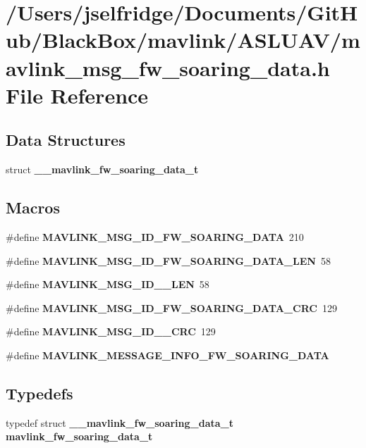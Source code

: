 \section{/\+Users/jselfridge/\+Documents/\+Git\+Hub/\+Black\+Box/mavlink/\+A\+S\+L\+U\+A\+V/mavlink\+\_\+msg\+\_\+fw\+\_\+soaring\+\_\+data.h File Reference}
\label{mavlink__msg__fw__soaring__data_8h}
\subsection*{Data Structures}
\begin{DoxyCompactItemize}
\item 
struct \textbf{ \+\_\+\+\_\+mavlink\+\_\+fw\+\_\+soaring\+\_\+data\+\_\+t}
\end{DoxyCompactItemize}
\subsection*{Macros}
\begin{DoxyCompactItemize}
\item 
\#define \textbf{ M\+A\+V\+L\+I\+N\+K\+\_\+\+M\+S\+G\+\_\+\+I\+D\+\_\+\+F\+W\+\_\+\+S\+O\+A\+R\+I\+N\+G\+\_\+\+D\+A\+TA}~210
\item 
\#define \textbf{ M\+A\+V\+L\+I\+N\+K\+\_\+\+M\+S\+G\+\_\+\+I\+D\+\_\+\+F\+W\+\_\+\+S\+O\+A\+R\+I\+N\+G\+\_\+\+D\+A\+T\+A\+\_\+\+L\+EN}~58
\item 
\#define \textbf{ M\+A\+V\+L\+I\+N\+K\+\_\+\+M\+S\+G\+\_\+\+I\+D\+\_\+\_\+\+L\+EN}~58
\item 
\#define \textbf{ M\+A\+V\+L\+I\+N\+K\+\_\+\+M\+S\+G\+\_\+\+I\+D\+\_\+\+F\+W\+\_\+\+S\+O\+A\+R\+I\+N\+G\+\_\+\+D\+A\+T\+A\+\_\+\+C\+RC}~129
\item 
\#define \textbf{ M\+A\+V\+L\+I\+N\+K\+\_\+\+M\+S\+G\+\_\+\+I\+D\+\_\+\_\+\+C\+RC}~129
\item 
\#define \textbf{ M\+A\+V\+L\+I\+N\+K\+\_\+\+M\+E\+S\+S\+A\+G\+E\+\_\+\+I\+N\+F\+O\+\_\+\+F\+W\+\_\+\+S\+O\+A\+R\+I\+N\+G\+\_\+\+D\+A\+TA}
\end{DoxyCompactItemize}
\subsection*{Typedefs}
\begin{DoxyCompactItemize}
\item 
typedef struct \textbf{ \+\_\+\+\_\+mavlink\+\_\+fw\+\_\+soaring\+\_\+data\+\_\+t} \textbf{ mavlink\+\_\+fw\+\_\+soaring\+\_\+data\+\_\+t}
\end{DoxyCompactItemize}


